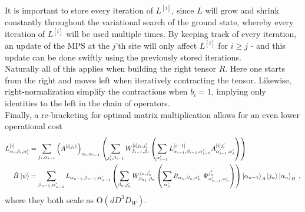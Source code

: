It is important to store every iteration of $L^{[i]}$, since $L$ will grow and shrink constantly throughout the variational search of the ground state, whereby every iteration of $L^{[i]}$ will be used multiple times. By keeping track of every iteration, an update of the MPS at the $j$'th site will only affect $L^{[i]}$ for $i \geq j$ - and this update can be done swiftly using the previously stored iterations.\\

Naturally all of this applies when building the right tensor $R$. Here one starts from the right and moves left when iteratively contracting the tensor. Likewise, right-normalization simplify the contractions when $b_i = 1$, implying only identities to the left in the chain of operators.\\

Finally, a re-bracketing for optimal matrix multiplication allows for an even lower operational cost
\begin{align*}
	L_{\alpha_i , \beta_i , \alpha_i '}^{[i]} &= \sum_{j_i , \alpha_{i-1}} \left( A^{[i] j_i \dag} \right)_{\alpha_i , \alpha_{i-1}} \left( \sum_{j_i ' , \beta_{i-1}} W_{\beta_{i-1} , \beta_i}^{[i] j_i , j_i '} \left( \sum_{\alpha_{i-1} '}  L_{\alpha_{i-1} , \beta_{i-1} , \alpha_{i-1} '}^{[i-1]} A_{\alpha_{i-1} ' , \alpha_i '}^{[i] j_i '} \right) \right) \\
	 \hat{H} \ket{\psi} &= \sum_{\beta_{n-1} , \alpha_{n-1} '}  L_{\alpha_{n-1}, \beta_{n-1} , \alpha_{n-1} '} \left( \sum_{\beta_n , j_n '} W_{\beta_{n_1}, \beta_n}^{j_n , j_n '} \left( \sum_{\alpha_n '} R_{\alpha_{n} ,\beta_{n} , \alpha_{n} '} \; \Psi_{\alpha_{n-1} ' , \alpha_{n} '}^{j_n '} \right) \right) \ket{\alpha_{n-1}}_A \ket{j_n} \ket{\alpha_{n}}_B \; ,
\end{align*}
where they both scale as $\mathrm{O}(d D^3 D_W)$.\\
  

